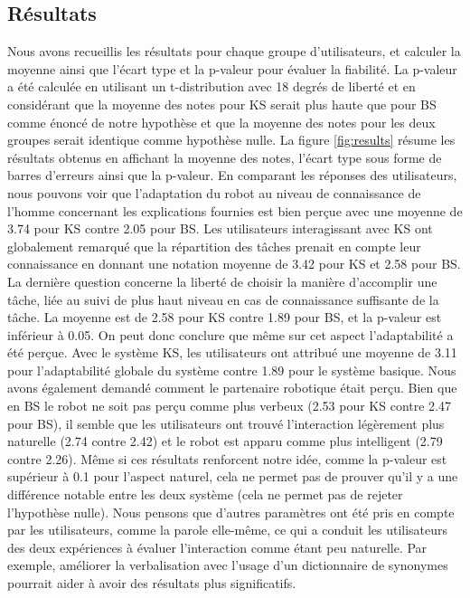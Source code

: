\documentclass[a4paper,11pt,twoside]{StyleThese}
\begin{document}
\subsection{Résultats}

Nous avons recueillis les résultats pour chaque groupe d'utilisateurs, et calculer la moyenne ainsi que l'écart type et la p-valeur pour évaluer la fiabilité. La p-valeur a été calculée en utilisant un t-distribution avec 18 degrés de liberté et en considérant que la moyenne des notes pour KS serait plus haute que pour BS comme énoncé de notre hypothèse et que la moyenne des notes pour les deux groupes serait identique comme hypothèse nulle.
La figure \ref{fig:results} résume les résultats obtenus en affichant la moyenne des notes, l'écart type sous forme de barres d'erreurs ainsi que la p-valeur. En comparant les réponses des utilisateurs, nous pouvons voir que l'adaptation du robot au niveau de connaissance de l'homme concernant les explications fournies est bien perçue avec une moyenne de 3.74 pour KS contre 2.05 pour BS. Les utilisateurs interagissant avec KS ont globalement remarqué que la répartition des tâches prenait en compte leur connaissance en donnant une notation moyenne de 3.42 pour KS et 2.58 pour BS. La dernière question concerne la liberté de choisir la manière d'accomplir une tâche, liée au suivi de plus haut niveau en cas de connaissance suffisante de la tâche. La moyenne est de 2.58 pour KS contre 1.89 pour BS, et la p-valeur est inférieur à 0.05. On peut donc conclure que même sur cet aspect l'adaptabilité a été perçue.
Avec le système KS, les utilisateurs ont attribué une moyenne de 3.11 pour l'adaptabilité globale du système contre 1.89 pour le système basique.
Nous avons également demandé comment le partenaire robotique était perçu. Bien que en BS le robot ne soit pas perçu comme plus verbeux (2.53 pour KS contre 2.47 pour BS), il semble que les utilisateurs ont trouvé l'interaction légèrement plus naturelle (2.74 contre 2.42) et le robot est apparu comme plus intelligent (2.79 contre 2.26). Même si ces résultats renforcent notre idée, comme la p-valeur est supérieur à 0.1 pour l'aspect naturel, cela ne permet pas de prouver qu'il y a une différence notable entre les deux système (cela ne permet pas de rejeter l'hypothèse nulle).
Nous pensons que d'autres paramètres ont été pris en compte par les utilisateurs, comme la parole elle-même, ce qui a conduit les utilisateurs des deux expériences à évaluer l'interaction comme étant peu naturelle. Par exemple, améliorer la verbalisation avec l'usage d'un dictionnaire de synonymes pourrait aider à avoir des résultats plus significatifs.
\end{document}
